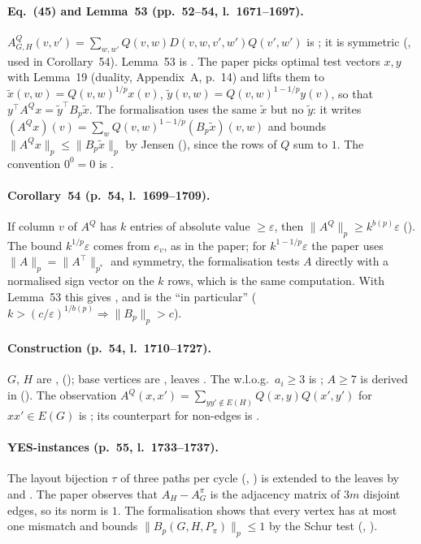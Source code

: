 \paragraph{Eq.~(45) and Lemma~53 (pp.~52--54, l.~1671--1697).} $A^Q_{G,H}(v,v')=\sum_{w,w'}Q(v,w)D(v,w,v',w')Q(v',w')$
is ; it is symmetric (, used in Corollary~54). Lemma~53 is
. The paper picks optimal test vectors $x,y$ with Lemma~19 (duality, Appendix~A, p.~14) and lifts them to
$\tilde x(v,w)=Q(v,w)^{1/p}x(v)$, $\tilde y(v,w)=Q(v,w)^{1-1/p}y(v)$, so that $y^\top A^Qx=\tilde y^\top B_p\tilde x$.
The formalisation uses the same $\tilde x$ but no $\tilde y$: it writes
$(A^Qx)(v)=\sum_wQ(v,w)^{1-1/p}(B_p\tilde x)(v,w)$ and bounds $\|A^Qx\|_p\le\|B_p\tilde x\|_p$ by Jensen
(), since the rows of $Q$ sum to $1$. The convention $0^0=0$ is .

\paragraph{Corollary~54 (p.~54, l.~1699--1709).} If column $v$ of $A^Q$ has $k$ entries of absolute value
$\ge\varepsilon$, then $\|A^Q\|_p\ge k^{b(p)}\varepsilon$ (). The bound
$k^{1/p}\varepsilon$ comes from $e_v$, as in the paper; for $k^{1-1/p}\varepsilon$ the paper uses
$\|A\|_p=\|A^\top\|_{p^*}$ and symmetry, the formalisation tests $A$ directly with a normalised sign vector on
the $k$ rows, which is the same computation. With Lemma~53 this gives , and
 is the ``in particular'' ($k>(c/\varepsilon)^{1/b(p)}\Rightarrow\|B_p\|_p>c$).

\paragraph{Construction (p.~54, l.~1710--1727).} $G$, $H$ are , 
(); base vertices are , leaves . The w.l.o.g.\ $a_i\ge3$ is
; $A\ge7$ is derived in  (). The observation
$A^Q(x,x')=\sum_{yy'\notin E(H)}Q(x,y)Q(x',y')$ for $xx'\in E(G)$ is ; its
counterpart for non-edges is .

\paragraph{YES-instances (p.~55, l.~1733--1737).} The layout bijection $\tau$ of three paths per cycle
(, ) is extended to the leaves by
 and . The paper observes that $A_H-A^\pi_G$ is the
adjacency matrix of $3m$ disjoint edges, so its norm is $1$. The formalisation shows that every vertex has
at most one mismatch and bounds $\|B_p(G,H,P_\pi)\|_p\le1$ by the Schur test
(, ).

